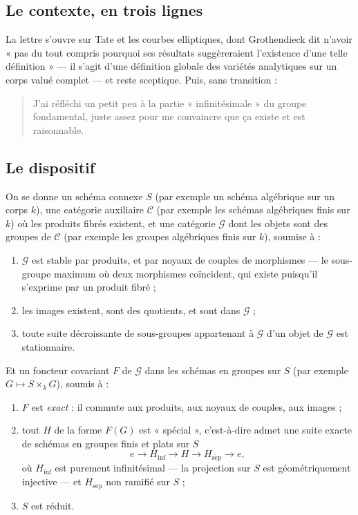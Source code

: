 \documentclass[11pt,a4paper]{article}
\begin{document}
\subsection*{Le contexte, en trois lignes}

La lettre s'ouvre sur Tate et les courbes elliptiques, dont Grothendieck dit
n'avoir « pas du tout compris pourquoi ses résultats suggèreraient l'existence
d'une telle définition » --- il s'agit d'une définition globale des variétés
analytiques sur un corps valué complet --- et reste sceptique. Puis, sans
transition :

\begin{quote}
J'ai réfléchi un petit peu à la partie « infinitésimale » du groupe
fondamental, juste assez pour me convaincre que ça existe et est raisonnable.
\end{quote}

\subsection*{Le dispositif}

On se donne un schéma connexe $S$ (par exemple un schéma algébrique sur un
corps $k$), une catégorie auxiliaire $\mathcal{C}$ (par exemple les schémas
algébriques finis sur $k$) où les produits fibrés existent, et une catégorie
$\mathcal{G}$ dont les objets sont des groupes de $\mathcal{C}$ (par exemple
les groupes algébriques finis sur $k$), soumise à :

\begin{enumerate}
  \item[(i)] $\mathcal{G}$ est stable par produits, et par noyaux de couples de
    morphismes --- le sous-groupe maximum où deux morphismes coïncident, qui
    existe puisqu'il s'exprime par un produit fibré ;
  \item[(ii)] les images existent, sont des quotients, et sont dans
    $\mathcal{G}$ ;
  \item[(iii)] toute suite décroissante de sous-groupes appartenant à
    $\mathcal{G}$ d'un objet de $\mathcal{G}$ est stationnaire.
\end{enumerate}

Et un foncteur covariant $F$ de $\mathcal{G}$ dans les schémas en groupes sur
$S$ (par exemple $G \mapsto S \times_{k} G$), soumis à :

\begin{enumerate}
  \item[(iv)] $F$ est \emph{exact} : il commute aux produits, aux noyaux de
    couples, aux images ;
  \item[(v)] tout $H$ de la forme $F(G)$ est « spécial », c'est-à-dire admet
    une suite exacte de schémas en groupes finis et plats sur $S$
    \[
      e \longrightarrow H_{\mathrm{inf}} \longrightarrow H \longrightarrow
      H_{\mathrm{s\acute{e}p}} \longrightarrow e ,
    \]
    où $H_{\mathrm{inf}}$ est purement infinitésimal --- la projection sur $S$
    est géométriquement injective --- et $H_{\mathrm{s\acute{e}p}}$ non ramifié
    sur $S$ ;
  \item[(vi)] $S$ est réduit.
\end{enumerate}
\end{document}
